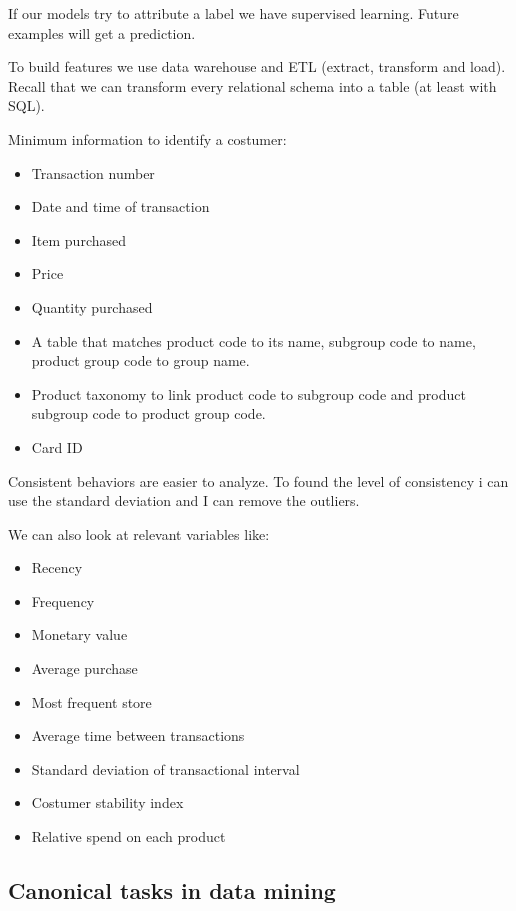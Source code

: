 If our models try to attribute a label we have supervised learning. Future examples will get a prediction.


\vspace{10pt}


To build features we use data warehouse and ETL (extract, transform and load). Recall that we can transform every relational schema into a table (at least with SQL).

\vspace{10 pt}

Minimum information to identify a costumer:
\begin{itemize}
    \item Transaction number
    \item Date and time of transaction
    \item Item purchased
    \item Price
    \item Quantity purchased
    \item A table that matches product code to its name, subgroup code to name, product group code to group name.
    \item Product taxonomy to link product code to subgroup code and product subgroup code to product group code.
    \item Card ID
\end{itemize}

Consistent behaviors are easier to analyze. To found the level of consistency i can use the standard deviation and I can remove the outliers.

\vspace{10pt}

We can also look at relevant variables like:
\begin{itemize}
    \item Recency
    \item Frequency
    \item Monetary value
    \item Average purchase
    \item Most frequent store
    \item Average time between transactions
    \item Standard deviation of transactional interval
    \item Costumer stability index
    \item Relative spend on each product
\end{itemize}

\subsection{Canonical tasks in data mining}

